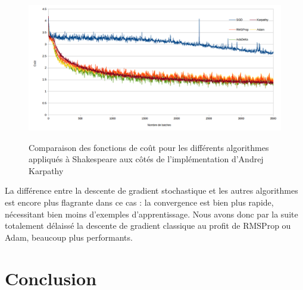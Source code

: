 \begin{figure}[!h]
\begin{center}
	{\includegraphics[scale=0.4]{images/chapter8/comparison.png}\label{Algorithmes}}
  \caption{Comparaison des fonctions de coût pour les différents algorithmes appliqués à Shakespeare aux côtés de l'implémentation d'Andrej Karpathy}
\end{center}
\end{figure}

La différence entre la descente de gradient stochastique et les autres algorithmes est encore plus flagrante dans ce cas : la convergence est bien plus rapide, nécessitant bien moins d'exemples d'apprentissage. Nous avons donc par la suite totalement délaissé la descente de gradient classique au profit de RMSProp ou Adam, beaucoup plus performants.

\section {Conclusion}